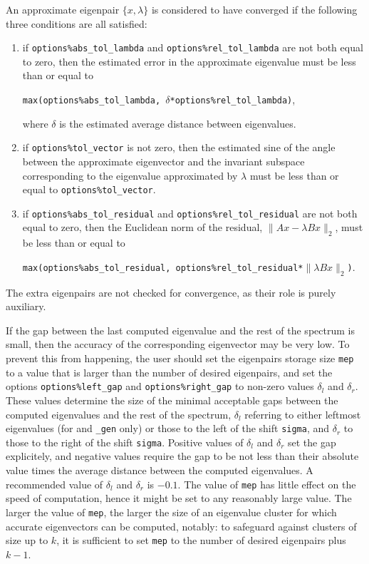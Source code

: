 An approximate eigenpair 
$\{x,\lambda\}$ is considered to have converged
if %
the following three conditions are all satisfied:
%
\begin{enumerate}
%
\item
if {\tt options\%abs\_tol\_lambda} and 
{\tt options\%rel\_tol\_lambda}
are not both equal to zero, then
the estimated error in the approximate eigenvalue
must be less than or equal to

{\tt max(options\%abs\_tol\_lambda, 
$\delta$*options\%rel\_tol\_lambda)},

where $\delta$ is the estimated average distance
between eigenvalues.
\item
if {\tt options\%tol\_vector} is not zero, then
the estimated sine of the angle between
the approximate eigenvector and the invariant subspace
corresponding to the eigenvalue 
approximated by $\lambda$
must be less than or equal to {\tt options\%tol\_vector}.
\item
if {\tt options\%abs\_tol\_residual} and 
{\tt options\%rel\_tol\_residual}
are not both equal to zero, then
the Euclidean norm of the residual,
$\|A x - \lambda B x\|_2$,
must be less than or equal to

{\tt max(options\%abs\_tol\_residual, 
options\%rel\_tol\_residual*$\|\lambda B x\|_2$)}.
%
\end{enumerate}
%
The extra eigenpairs are not checked for convergence,
as their role is purely auxiliary.

If the gap %
between the last computed eigenvalue 
and the rest of the spectrum is small,
then the accuracy of the corresponding eigenvector may be very low.
To prevent this from happening,
the user should set the eigenpairs storage size {\tt mep}
to a value that is larger than the number of desired eigenpairs,
and set the options 
{\tt options\%left\_gap}
and
{\tt options\%right\_gap}
to non-zero values $\delta_l$ and $\delta_r$.
These values
determine the size of the minimal acceptable gaps
between the computed eigenvalues and the rest of the spectrum,
$\delta_l$ referring to either leftmost eigenvalues
(for {\tt \solver} and {\tt \solver\_gen} only)
or those to the left of the shift {\tt sigma},
and $\delta_r$
to those to the right of the shift {\tt sigma}.
Positive values of $\delta_l$ and $\delta_r$
set the gap explicitely,
and negative values
require the gap to be not less than their absolute value times
the average distance between the computed eigenvalues.
A recommended value of $\delta_l$ and $\delta_r$ is $-0.1$.
The value of {\tt mep} %
has little effect on
the speed of computation,
hence it might be set to any reasonably large value.
The larger the value of {\tt mep}, 
the larger the size of an eigenvalue cluster
for which accurate eigenvectors can be computed, notably:
to safeguard against clusters of size up to $k$,
it is sufficient to set {\tt mep} to the number of desired eigenpairs
plus $k - 1$.

